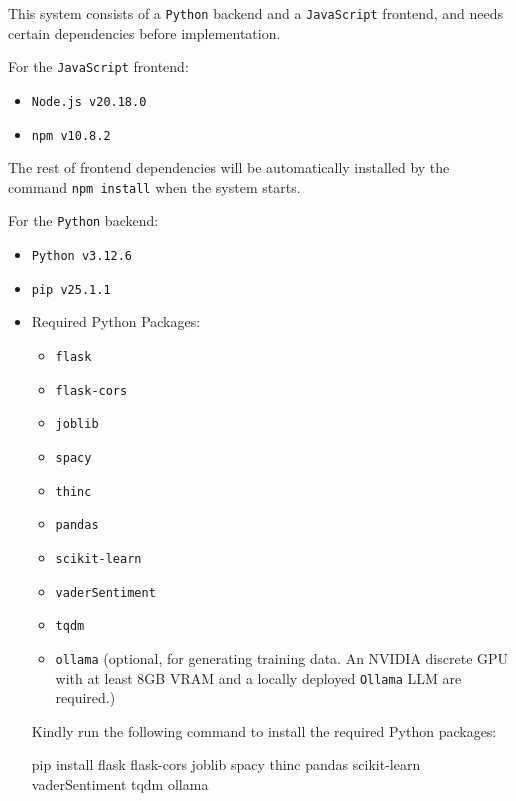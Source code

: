 \documentclass{xum_review}
\begin{document}
This system consists of a \texttt{Python} backend and a \texttt{JavaScript} frontend, and needs
certain dependencies before implementation.

\noindent For the \texttt{JavaScript} frontend:
\begin{itemize}
	\item \texttt{Node.js v20.18.0} 
	\item \texttt{npm v10.8.2}
\end{itemize}

The rest of frontend dependencies will be automatically installed by the command \texttt{npm install}
when the system starts.

\noindent For the \texttt{Python} backend:
\begin{itemize}
	\item \texttt{Python v3.12.6} 
	\item \texttt{pip v25.1.1}
	\item Required Python Packages:
	\begin{itemize}
		\item \texttt{flask}
		\item \texttt{flask-cors}
		\item \texttt{joblib}
		\item \texttt{spacy}
		\item \texttt{thinc}
		\item \texttt{pandas}
		\item \texttt{scikit-learn}
		\item \texttt{vaderSentiment}
		\item \texttt{tqdm} 
		\item \texttt{ollama} (optional, for generating training data. An NVIDIA
		discrete GPU with at least 8GB VRAM and a locally deployed \texttt{Ollama} LLM are required.)
	\end{itemize}
	Kindly run the following command to install the required Python packages:\\
	\begin{cmd}
	pip install flask flask-cors joblib spacy thinc pandas scikit-learn vaderSentiment tqdm ollama	
	\end{cmd}
\end{itemize}
\end{document}
